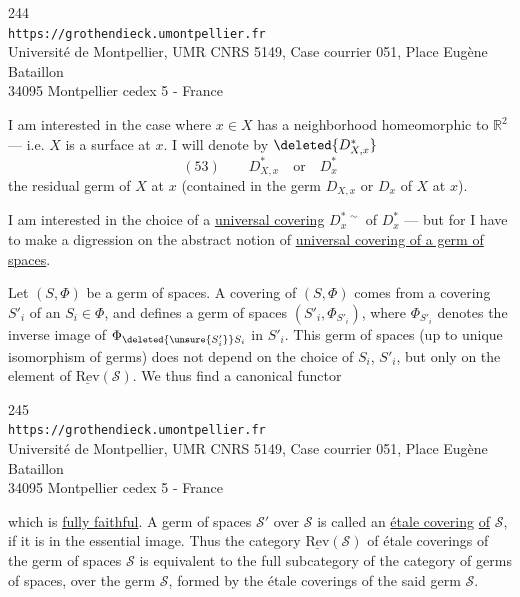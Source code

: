 
\begin{center}
244\\
\texttt{https://grothendieck.umontpellier.fr}\\
Université de Montpellier, UMR CNRS 5149, Case courrier 051, Place Eugène Bataillon\\
34095 Montpellier cedex 5 - France
\end{center}


 I am interested in the case where $x\in X$ has a neighborhood homeomorphic to $\mathbb R^2$ --- i.e. $X$ is a surface at $x$. I will denote by $\deleted{D_{X,x}^{*}}$
\[
(53)\qquad D_{X,x}^{*}\quad\text{or}\quad D_x^{*}
\]
the residual germ of $X$ at $x$ (contained in the germ $D_{X,x}$ or $D_x$ of $X$ at $x$).

I am interested in the choice of a \uline{universal covering} $D_x^{*\,\sim}$ of $D_x^{*}$ --- but for  I have to make a digression on the abstract notion of \uline{universal covering of a germ of spaces}.

Let $(S,\Phi)$ be a germ of spaces. A covering of $(S,\Phi)$ comes from a covering $S'_i$ of an $S_i\in\Phi$, and defines a germ of spaces $(S'_i,\Phi_{S'_i})$, where $\Phi_{S'_i}$ denotes the inverse image of $\Phi_{\deleted{\unsure{S'_i}}S_i}$ in $S'_i$. This germ of spaces  (up to unique isomorphism of germs) does not depend on the choice of $S_i$, $S'_i$, but only on the element of $\underline{\mathrm{Rev}}(\mathcal S)$. We thus find a canonical functor


\begin{center}
245\\
\texttt{https://grothendieck.umontpellier.fr}\\
Université de Montpellier, UMR CNRS 5149, Case courrier 051, Place Eugène Bataillon\\
34095 Montpellier cedex 5 - France
\end{center}



which is \uline{fully faithful}. A germ of spaces $\mathcal S'$ over $\mathcal S$ is called  an \uline{étale covering} \uline{of} $\mathcal S$, if it is in the essential image. Thus the category $\underline{\mathrm{Rev}}(\mathcal S)$ of étale coverings of the germ of spaces $\mathcal S$ is equivalent to the full subcategory of the  category of germs of spaces, over the germ $\mathcal S$,  formed by the étale coverings of the said germ $\mathcal S$.

